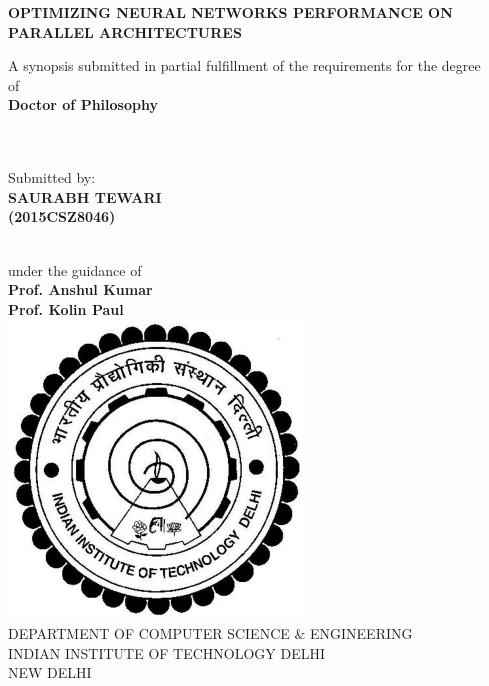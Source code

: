 \documentclass[a4paper,10pt]{article}
\begin{document}
	
\begin{titlepage}
	
	\begin{center}
		
		\vspace{4cm}
	\LARGE \textbf{OPTIMIZING NEURAL NETWORKS PERFORMANCE  ON PARALLEL ARCHITECTURES}\\		
		\vspace{2cm}
		
		\large {A synopsis submitted in partial fulfillment of the requirements for the degree\ \\}
		\vspace{0.5cm}
		\large {of\ \\}
		\vspace{0.5cm}
		\Large \textbf{Doctor of Philosophy \ \\}
		\vspace{0.5cm}
		
		\large \ \\ \ \\ Submitted by: \ \\
		\Large \textbf{SAURABH TEWARI \ \\ (2015CSZ8046)} 
		
		\large {\ \\ under the guidance of \ \\}
		\large \textbf{ Prof. Anshul Kumar\\ }
		\large \textbf{ Prof. Kolin Paul\\ }
		\vspace{2.0cm}
		\hspace{0cm}
		\includegraphics[scale=1.0]{images/logo.pdf} \\
		\vspace{2.0cm} 
		\Large {DEPARTMENT OF COMPUTER SCIENCE \& ENGINEERING}\\
		\Large {INDIAN INSTITUTE OF TECHNOLOGY DELHI \\ NEW DELHI}\\
	\end{center}
	
\end{titlepage}
\end{document}
